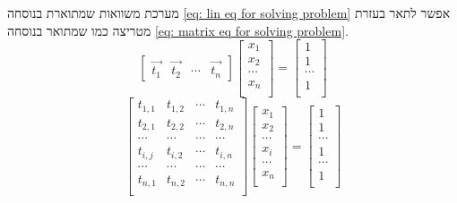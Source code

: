 \documentclass[12pt,leqno]{article}
\theoremstyle{theoremdd}
\begin{document}
מערכת משוואות 
שמתוארת בנוסחה
\ref{eq: lin eq for solving problem}
אפשר לתאר
בעזרת מטריצה כמו שמתואר 
בנוסחה 
\ref{eq: matrix eq for solving problem}.
\begin{equation*}
    \begin{bmatrix}
        \vec{t_1} & \vec{t_2} & \cdots & \vec{t_n}
    \end{bmatrix}
    \begin{bmatrix}
        x_1 \\
        x_2 \\
        \cdots \\
        x_n \\
    \end{bmatrix}
    =
    \begin{bmatrix}
        1 \\
        1 \\
        \cdots \\
        1 \\
    \end{bmatrix}
\end{equation*}
\begin{equation}
    \label{eq: matrix eq for solving problem}
    \begin{bmatrix}
        t_{1,1} & t_{1,2} & \cdots & t_{1,n} \\
        t_{2,1} & t_{2,2} & \cdots & t_{2,n} \\
        \cdots & \cdots & \cdots & \cdots\\
        t_{i,j} & t_{i,2} & \cdots & t_{i,n} \\
        \cdots & \cdots & \cdots & \cdots\\
        t_{n,1} & t_{n,2} & \cdots & t_{n,n} \\
    \end{bmatrix}
    \begin{bmatrix}
        x_1 \\
        x_2 \\
        \cdots \\
        x_i \\
        \cdots \\
        x_n \\
    \end{bmatrix}
    = 
    \begin{bmatrix}
        1 \\
        1 \\
        \cdots \\
        1 \\
        \cdots \\
        1 \\
    \end{bmatrix}
\end{equation}
\end{document}
